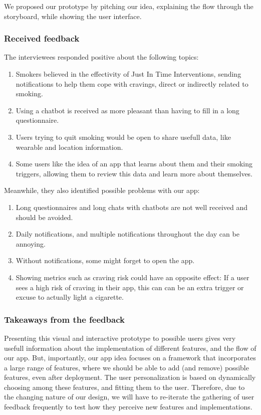 We proposed our prototype by pitching our idea, explaining the flow through the storyboard, while showing the user interface.

\subsubsection{Received feedback}
The interviewees responded positive about the following topics:
\begin{enumerate}
    \item Smokers believed in the effectivity of Just In Time Interventions, sending notifications to help them cope with cravings, direct or indirectly related to smoking.
    \item Using a chatbot is received as more pleasant than having to fill in a long questionnaire.
    \item Users trying to quit smoking would be open to share usefull data, like wearable and location information.
    \item Some users like the idea of an app that learns about them and their smoking triggers, allowing them to review this data and learn more about themselves.
\end{enumerate}

Meanwhile, they also identified possible problems with our app:
\begin{enumerate}
    \item Long questionnaires and long chats with chatbots are not well received and should be avoided.
    \item Daily notifications, and multiple notifications throughout the day can be annoying.
    \item Without notifications, some might forget to open the app.
    \item Showing metrics such as craving risk could have an opposite effect: If a user sees a high risk of craving in their app, this can can be an extra trigger or excuse to actually light a cigarette.
\end{enumerate}

\subsubsection{Takeaways from the feedback}

Presenting this visual and interactive prototype to possible users gives very usefull
information about the implementation of different features, and the flow of our app. 
But, importantly, our app idea focuses on a framework that incorporates a large range of features, 
where we should be able to add (and remove) possible features, even after deployment.
The user personalization is based on dynamically choosing among these features, and fitting them to the user.
Therefore, due to the changing nature of our design, 
we will have to re-iterate the gathering of user feedback frequently to test how they perceive new features and implementations.

